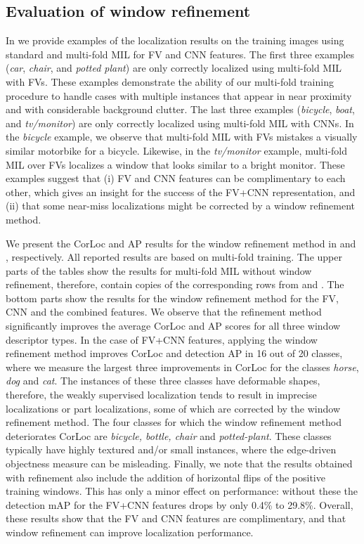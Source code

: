 \documentclass[10pt,journal,cspaper,final,twocolumn,compsoc]{./IEEEtran}
\begin{document}
\subsection{Evaluation of window refinement}

In  we provide examples of the
localization results on the training images using standard
and multi-fold MIL for  FV and  CNN features.
The first three examples ({\em car}, {\em chair}, and {\em
potted plant}) are  only  correctly localized using
multi-fold MIL with FVs. 
These examples demonstrate the ability of our multi-fold training procedure to handle cases
with multiple instances that appear in near proximity and
with considerable background clutter. 
The last three examples ({\em bicycle}, {\em boat}, and
{\em tv/monitor}) are  only  correctly localized using multi-fold MIL with CNNs. 
  In the {\em bicycle}
example, we observe that multi-fold MIL with FVs mistakes
a visually similar motorbike for a bicycle.
Likewise, in the {\em tv/monitor} example, multi-fold MIL
over FVs localizes a window that looks similar to a bright
monitor. 
These examples  suggest that (i) FV and
CNN features can be complimentary to each other, which gives an insight for the success of the FV+CNN representation, and (ii) that some near-miss localizations might be corrected by a  window refinement method.  

We present the CorLoc and AP results for the window refinement method in
 and , respectively.  
All reported results are based on multi-fold training.
The upper parts of the tables show the results for multi-fold MIL
without window refinement, therefore, contain copies of the corresponding rows from   and . The bottom parts show the results for the window
refinement method for the FV, CNN and the combined features. We observe that the 
refinement method significantly improves the 
average CorLoc and AP scores for all three window descriptor types.
In the case of FV+CNN features, applying the window refinement method improves CorLoc and detection AP 
in 16 out of 20 classes, where we measure the largest three
improvements in CorLoc for the classes {\em horse}, {\em dog} and
{\em cat}. The instances of these three classes have
deformable shapes, therefore, the weakly supervised
localization tends to result in imprecise localizations or
part localizations, some of which are corrected by the
window refinement method. The four classes for which the
window refinement method deteriorates CorLoc  are {\em
bicycle,  bottle, chair} and {\em potted-plant}.  These
classes typically have highly textured and/or small
instances, where the edge-driven objectness measure can be
misleading. Finally, we note that the results obtained with refinement also
include the addition of horizontal flips of the positive
training windows. This has only a minor effect on
performance: without these the detection mAP for the FV+CNN features drops by only
0.4\% to 29.8\%. Overall, these results show that the FV and CNN
features are complimentary, and that window refinement can
improve localization performance.
\end{document}

